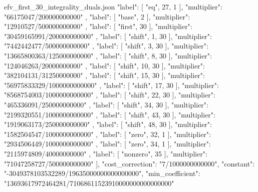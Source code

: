 \documentclass[12pt,a4paper]{article}
\numberwithin{equation}{section}
\theoremstyle{definition}
\begin{document}
\begin{filecontents*}[overwrite]{efv_first_30_integrality_duals.json}
        {
          "label": [
            "eq",
            27,
            1
          ],
          "multiplier": "66175047/200000000000"
        },
        {
          "label": [
            "base",
            2
          ],
          "multiplier": "12910527/500000000000"
        },
        {
          "label": [
            "first",
            30
          ],
          "multiplier": "30459165991/200000000000"
        },
        {
          "label": [
            "shift",
            1,
            30
          ],
          "multiplier": "7442442477/500000000000"
        },
        {
          "label": [
            "shift",
            3,
            30
          ],
          "multiplier": "13665800363/125000000000"
        },
        {
          "label": [
            "shift",
            8,
            30
          ],
          "multiplier": "124046263/20000000000"
        },
        {
          "label": [
            "shift",
            10,
            30
          ],
          "multiplier": "382104131/31250000000"
        },
        {
          "label": [
            "shift",
            15,
            30
          ],
          "multiplier": "56975833329/1000000000000"
        },
        {
          "label": [
            "shift",
            17,
            30
          ],
          "multiplier": "8568754003/1000000000000"
        },
        {
          "label": [
            "shift",
            22,
            30
          ],
          "multiplier": "465336091/250000000000"
        },
        {
          "label": [
            "shift",
            34,
            30
          ],
          "multiplier": "2199320551/1000000000000"
        },
        {
          "label": [
            "shift",
            43,
            30
          ],
          "multiplier": "1919063173/250000000000"
        },
        {
          "label": [
            "shift",
            48,
            30
          ],
          "multiplier": "1582504547/1000000000000"
        },
        {
          "label": [
            "zero",
            32,
            1
          ],
          "multiplier": "2934506449/1000000000000"
        },
        {
          "label": [
            "zero",
            34,
            1
          ],
          "multiplier": "2115974809/40000000000"
        },
        {
          "label": [
            "nonzero",
            35
          ],
          "multiplier": "71047258727/500000000000"
        }
      ],
      "cost_correction": "7/1000000000000",
      "constant": "-3049378103532289/19635000000000000000",
      "min_coefficient": "13693617972464281/71068611523910000000000000000"

\end{filecontents*}
\end{document}

